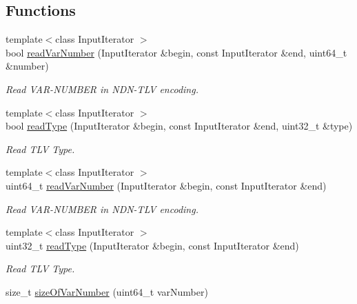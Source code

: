 \subsection*{Functions}
\begin{DoxyCompactItemize}
\item 
{\footnotesize template$<$class Input\+Iterator $>$ }\\bool \hyperlink{namespacendn_1_1tlv_a0eb5fc81577b521080e70e405c5cf727}{read\+Var\+Number} (Input\+Iterator \&begin, const Input\+Iterator \&end, uint64\+\_\+t \&number)
\begin{DoxyCompactList}\small\item\em Read V\+A\+R-\/\+N\+U\+M\+B\+ER in N\+D\+N-\/\+T\+LV encoding. \end{DoxyCompactList}\item 
{\footnotesize template$<$class Input\+Iterator $>$ }\\bool \hyperlink{namespacendn_1_1tlv_a354b28ea0e57b0701a93cd32f52e1c50}{read\+Type} (Input\+Iterator \&begin, const Input\+Iterator \&end, uint32\+\_\+t \&type)
\begin{DoxyCompactList}\small\item\em Read T\+LV Type. \end{DoxyCompactList}\item 
{\footnotesize template$<$class Input\+Iterator $>$ }\\uint64\+\_\+t \hyperlink{namespacendn_1_1tlv_a7c92484c25d1c405655803f215d6f984}{read\+Var\+Number} (Input\+Iterator \&begin, const Input\+Iterator \&end)
\begin{DoxyCompactList}\small\item\em Read V\+A\+R-\/\+N\+U\+M\+B\+ER in N\+D\+N-\/\+T\+LV encoding. \end{DoxyCompactList}\item 
{\footnotesize template$<$class Input\+Iterator $>$ }\\uint32\+\_\+t \hyperlink{namespacendn_1_1tlv_acbea9635b2144fab082b6e82400522c8}{read\+Type} (Input\+Iterator \&begin, const Input\+Iterator \&end)
\begin{DoxyCompactList}\small\item\em Read T\+LV Type. \end{DoxyCompactList}\item 
size\+\_\+t \hyperlink{namespacendn_1_1tlv_a0fd2b95ee6ef678363f59a74265473fc}{size\+Of\+Var\+Number} (uint64\+\_\+t var\+Number)\hypertarget{namespacendn_1_1tlv_a0fd2b95ee6ef678363f59a74265473fc}{}\label{namespacendn_1_1tlv_a0fd2b95ee6ef678363f59a74265473fc}


\end{DoxyCompactItemize}

